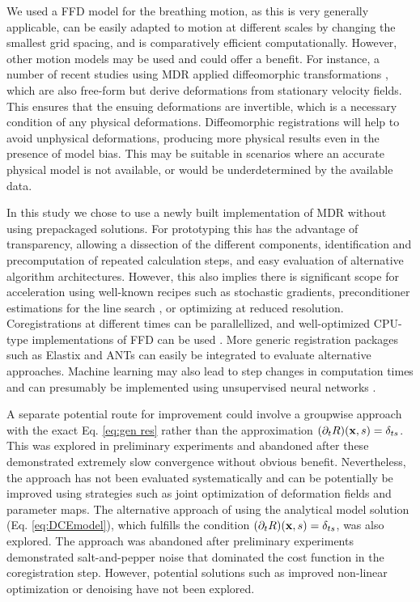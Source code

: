 \documentclass[num-refs]{wiley-article}
\newcommand{\x}{{\bf x}}
\begin{document}
We used a FFD model for the breathing motion, as this is very generally applicable, can be easily adapted to motion at different scales by changing the smallest grid spacing, and is comparatively efficient computationally. However, other motion models may be used and could offer a benefit. For instance, a number of recent studies using MDR applied diffeomorphic transformations \cite{Bhushan2011, Hallack2014}, which are also free-form but derive deformations from stationary velocity fields. This ensures that the ensuing deformations are invertible, which is a necessary condition of any physical deformations. Diffeomorphic registrations will help to avoid unphysical deformations, producing more physical results even in the presence of model bias. This may be suitable in scenarios where an accurate physical model is not available, or would be underdetermined by the available data.

In this study we chose to use a newly built implementation of MDR without using prepackaged solutions. For prototyping this has the advantage of transparency, allowing a dissection of the different components, identification and precomputation of repeated calculation steps, and easy evaluation of alternative algorithm architectures. However, this also implies there is significant scope for acceleration using well-known recipes such as stochastic gradients, preconditioner estimations for the line search \cite{Qiao2019}, or optimizing at reduced resolution. Coregistrations at different times can be parallellized, and well-optimized CPU-type implementations of FFD can be used \cite{Modat2010}. More generic registration packages such as Elastix \cite{Klein2010} and ANTs \cite{Tustison2013} can easily be integrated to evaluate alternative approaches. Machine learning may also lead to step changes in computation times \cite{Lv2018} and can presumably be implemented using unsupervised neural networks \cite{Vos2019}. 

A separate potential route for improvement could involve a groupwise approach with the exact Eq. \ref{eq:gen res} rather than the approximation $(\partial_t R)(\x,s)=\delta_{ts}$. This was explored in preliminary experiments and abandoned after these demonstrated extremely slow convergence without obvious benefit. Nevertheless, the approach has not been evaluated systematically and can be potentially be improved using strategies such as joint optimization of deformation fields and parameter maps. The alternative approach of using the analytical model solution (Eq. \ref{eq:DCEmodel}), which fulfills the condition $(\partial_t R)(\x,s)=\delta_{ts}$, was also explored. The approach was abandoned after preliminary experiments demonstrated salt-and-pepper noise that dominated the cost function in the coregistration step. However, potential solutions such as improved non-linear optimization or denoising have not been explored.
\end{document}
